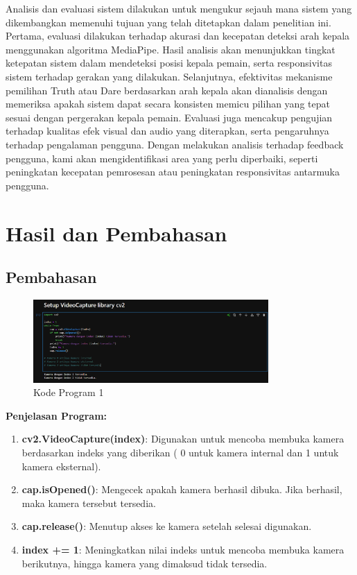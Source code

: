 \documentclass[11pt,a4paper]{article}
\begin{document}
\begin{enumerate}
    Analisis dan evaluasi sistem dilakukan untuk mengukur sejauh mana sistem yang dikembangkan memenuhi tujuan yang telah ditetapkan dalam penelitian ini. Pertama, evaluasi dilakukan terhadap akurasi dan kecepatan deteksi arah kepala menggunakan algoritma MediaPipe. Hasil analisis akan menunjukkan tingkat ketepatan sistem dalam mendeteksi posisi kepala pemain, serta responsivitas sistem terhadap gerakan yang dilakukan. Selanjutnya, efektivitas mekanisme pemilihan Truth atau Dare berdasarkan arah kepala akan dianalisis dengan memeriksa apakah sistem dapat secara konsisten memicu pilihan yang tepat sesuai dengan pergerakan kepala pemain. Evaluasi juga mencakup pengujian terhadap kualitas efek visual dan audio yang diterapkan, serta pengaruhnya terhadap pengalaman pengguna. Dengan melakukan analisis terhadap feedback pengguna, kami akan mengidentifikasi area yang perlu diperbaiki, seperti peningkatan kecepatan pemrosesan atau peningkatan responsivitas antarmuka pengguna.
\end{enumerate}

\newpage
\section{Hasil dan Pembahasan}
\subsection{Pembahasan}
\begin{figure}[H]
    \centering
    \includegraphics[width=0.8\textwidth]{1.png} %
    \caption{Kode Program 1}
    \label{fig:1}
\end{figure}
\textbf{Penjelasan Program:}
\begin{enumerate}
    \item \textbf{cv2.VideoCapture(index)}: Digunakan untuk mencoba membuka kamera berdasarkan indeks yang diberikan ( 0 untuk kamera internal dan 1 untuk kamera eksternal).
    \item \textbf{cap.isOpened()}: Mengecek apakah kamera berhasil dibuka. Jika berhasil, maka kamera tersebut tersedia.
    \item \textbf{cap.release()}: Menutup akses ke kamera setelah selesai digunakan.
    \item \textbf{index += 1}: Meningkatkan nilai indeks untuk mencoba membuka kamera berikutnya, hingga kamera yang dimaksud tidak tersedia.
\end{enumerate}
\end{document}
